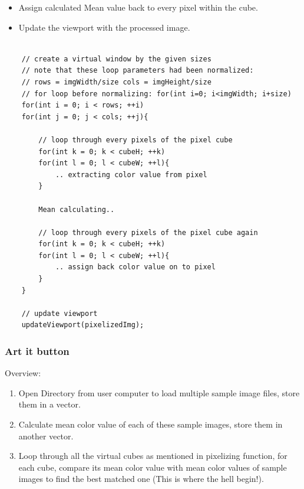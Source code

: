 \documentclass[english]{article}
\begin{document}
{\begin{itemize}
	\item Assign calculated Mean value back to every pixel within the cube.
	
	\item Update the viewport with the processed image. 
	
\end{itemize}

\newpage

\lstset{language=C++}

\begin{lstlisting}

	// create a virtual window by the given sizes
	// note that these loop parameters had been normalized:
	// rows = imgWidth/size cols = imgHeight/size
	// for loop before normalizing: for(int i=0; i<imgWidth; i+size)
	for(int i = 0; i < rows; ++i)
	for(int j = 0; j < cols; ++j){
	
		// loop through every pixels of the pixel cube
		for(int k = 0; k < cubeH; ++k)
		for(int l = 0; l < cubeW; ++l){
			.. extracting color value from pixel
		}
		
		Mean calculating.. 
		
		// loop through every pixels of the pixel cube again
		for(int k = 0; k < cubeH; ++k)
		for(int l = 0; l < cubeW; ++l){
			.. assign back color value on to pixel
		}	
	}
	
	// update viewport
	updateViewport(pixelizedImg);
\end{lstlisting}




\subsubsection{Art it button}

Overview: 

\begin{enumerate}
	\item Open Directory from user computer to load multiple sample image files, store them in a vector.
	
	\item Calculate mean color value of each of these sample images, store them in another vector.
	
	\item Loop through all the virtual cubes as mentioned in pixelizing function, for each cube, compare its mean color value with mean color values of sample images to find the best matched one (This is where the hell begin!). 
	

\end{enumerate}}
\end{document}
